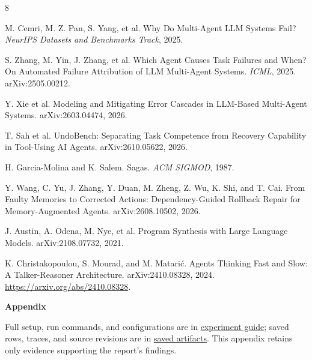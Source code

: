 \documentclass[9pt]{extarticle}
\begin{document}
\begin{thebibliography}{8}
\setlength{\itemsep}{0pt}

 M. Cemri, M. Z. Pan, S. Yang, et al. Why Do Multi-Agent LLM Systems Fail? \emph{NeurIPS Datasets and Benchmarks Track}, 2025.

 S. Zhang, M. Yin, J. Zhang, et al. Which Agent Causes Task Failures and When? On Automated Failure Attribution of LLM Multi-Agent Systems. \emph{ICML}, 2025. arXiv:2505.00212.

 Y. Xie et al. Modeling and Mitigating Error Cascades in LLM-Based Multi-Agent Systems. arXiv:2603.04474, 2026.

 T. Sah et al. UndoBench: Separating Task Competence from Recovery Capability in Tool-Using AI Agents. arXiv:2610.05622, 2026.

 H. Garcia-Molina and K. Salem. Sagas. \emph{ACM SIGMOD}, 1987.

 Y. Wang, C. Yu, J. Zhang, Y. Duan, M. Zheng, Z. Wu, K. Shi, and T. Cai. From Faulty Memories to Corrected Actions: Dependency-Guided Rollback Repair for Memory-Augmented Agents. arXiv:2608.10502, 2026.

 J. Austin, A. Odena, M. Nye, et al. Program Synthesis with Large Language Models. arXiv:2108.07732, 2021.

 K. Christakopoulou, S. Mourad, and M. Matari\'{c}. Agents Thinking Fast and Slow: A Talker-Reasoner Architecture. arXiv:2410.08328, 2024. \url{https://arxiv.org/abs/2410.08328}.

\end{thebibliography}
\clearpage
\appendix
\normalsize
\setlength{\parskip}{3pt}
\renewcommand{\arraystretch}{1.08}
\begin{center}{\Large\bfseries Appendix}\end{center}
\noindent Full setup, run commands, and configurations are in \href{https://github.com/UtkarshRjn/MAS-selective-recovery/blob/main/evals/README.md}{experiment guide}; saved rows, traces, and source revisions are in \href{https://github.com/UtkarshRjn/MAS-selective-recovery/tree/main/artifacts/phase1}{saved artifacts}. This appendix retains only evidence supporting the report's findings.
\end{document}
